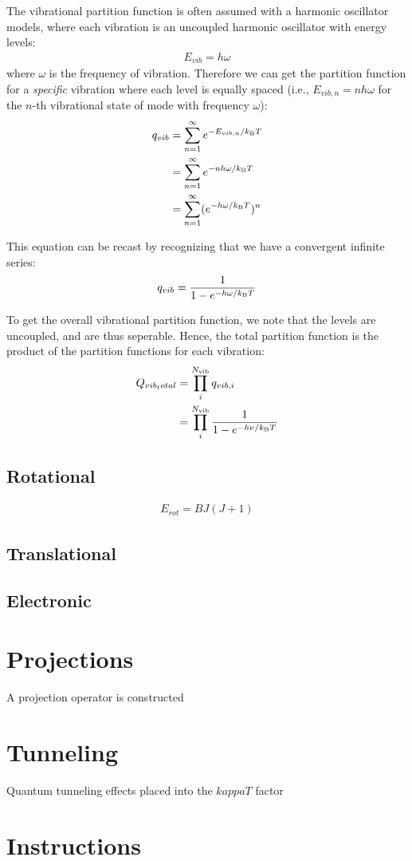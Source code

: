 \documentclass[11pt]{article}
\newcommand{\tnm}{\textnormal}
\newcommand{\kB}{k_{\tnm{B}}}
\begin{document}
The vibrational partition function is often assumed with a harmonic oscillator models, where each vibration is an uncoupled harmonic oscillator with energy levels:
\begin{align*}
E_{vib} = h\omega
\end{align*}
where $\omega$ is the frequency of vibration. Therefore we can get the partition function for a \textit{specific} vibration where each level is equally spaced (i.e., $E_{vib,n} = nh\omega$ for the $n$-th vibrational state of mode with frequency $\omega$):
\begin{align*}
q_{vib} &= \sum_{n=1}^{\infty} e^{-E_{vib,n}/ \kB T} \\
		&= \sum_{n=1}^{\infty} e^{-nh\omega/ \kB T} \\
		&= \sum_{n=1}^{\infty} ( e^{-h\omega/ \kB T} )^{n} 
\end{align*}

This equation can be recast by recognizing that we have a convergent infinite series:
\begin{align*}
q_{vib} = \frac{1}{1-e^{-h\omega/ \kB T}} 
\end{align*}

To get the overall vibrational partition function, we note that the levels are uncoupled, and are thus seperable. Hence, the total partition function is the product of the partition functions
for each vibration:
\begin{align*}
Q_{vib_total} &= \prod_{i}^{N_{\tnm{vib}}} q_{vib,i} \\
              &= \prod_{i}^{N_{\tnm{vib}}} \frac{1}{1-e^{-h\nu/ \kB T}}   
\end{align*}

\subsection{Rotational}

\begin{align*}
E_{rot} = BJ(J+1) 
\end{align*}

\subsection{Translational}
\subsection{Electronic}

\section{Projections}

A projection operator is constructed 

\section{Tunneling}

Quantum tunneling effects placed into the $kappa{T}$ factor


\section{Instructions}







%
\end{document}
